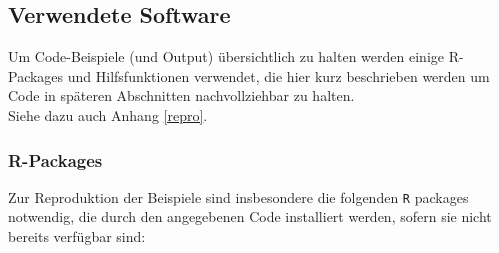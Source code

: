 \documentclass[ngerman,a4paper,]{scrartcl}
\newenvironment{Shaded}{\begin{snugshade}}{\end{snugshade}}
\newcommand{\CommentTok}[1]{\textcolor[rgb]{0.56,0.35,0.01}{\textit{#1}}}
\newcommand{\ControlFlowTok}[1]{\textcolor[rgb]{0.13,0.29,0.53}{\textbf{#1}}}
\newcommand{\DataTypeTok}[1]{\textcolor[rgb]{0.13,0.29,0.53}{#1}}
\newcommand{\KeywordTok}[1]{\textcolor[rgb]{0.13,0.29,0.53}{\textbf{#1}}}
\newcommand{\NormalTok}[1]{#1}
\newcommand{\OperatorTok}[1]{\textcolor[rgb]{0.81,0.36,0.00}{\textbf{#1}}}
\newcommand{\StringTok}[1]{\textcolor[rgb]{0.31,0.60,0.02}{#1}}
\theoremstyle{definition}
\theoremstyle{definition}
\theoremstyle{definition}
\theoremstyle{remark}
\begin{document}
\begin{Shaded}
\end{Shaded}

\hypertarget{software-funs}{%
\subsection{Verwendete Software}\label{software-funs}}

Um Code-Beispiele (und Output) übersichtlich zu halten werden einige R-Packages und Hilfsfunktionen verwendet, die hier kurz beschrieben werden um Code in späteren Abschnitten nachvollziehbar zu halten.\\
Siehe dazu auch Anhang \ref{repro}.

\hypertarget{r-packages}{%
\subsubsection{R-Packages}\label{r-packages}}

Zur Reproduktion der Beispiele sind insbesondere die folgenden \texttt{R} packages notwendig, die durch den angegebenen Code installiert werden, sofern sie nicht bereits verfügbar sind:
\end{document}
